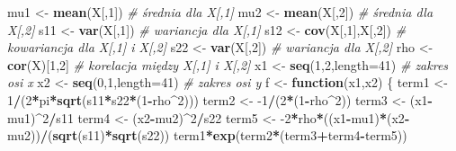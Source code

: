 \documentclass[polish,]{book}
\newenvironment{Shaded}{\begin{snugshade}}{\end{snugshade}}
\newcommand{\CommentTok}[1]{\textcolor[rgb]{0.56,0.35,0.01}{\textit{#1}}}
\newcommand{\ControlFlowTok}[1]{\textcolor[rgb]{0.13,0.29,0.53}{\textbf{#1}}}
\newcommand{\DataTypeTok}[1]{\textcolor[rgb]{0.13,0.29,0.53}{#1}}
\newcommand{\DecValTok}[1]{\textcolor[rgb]{0.00,0.00,0.81}{#1}}
\newcommand{\KeywordTok}[1]{\textcolor[rgb]{0.13,0.29,0.53}{\textbf{#1}}}
\newcommand{\NormalTok}[1]{#1}
\newcommand{\OperatorTok}[1]{\textcolor[rgb]{0.81,0.36,0.00}{\textbf{#1}}}
\newcommand{\StringTok}[1]{\textcolor[rgb]{0.31,0.60,0.02}{#1}}
\begin{document}
\begin{Shaded}
\begin{Highlighting}[]
\NormalTok{mu1 <-}\StringTok{ }\KeywordTok{mean}\NormalTok{(X[,}\DecValTok{1}\NormalTok{])      }\CommentTok{# średnia dla X[,1]}
\NormalTok{mu2 <-}\StringTok{ }\KeywordTok{mean}\NormalTok{(X[,}\DecValTok{2}\NormalTok{])      }\CommentTok{# średnia dla X[,2]}
\NormalTok{s11 <-}\StringTok{ }\KeywordTok{var}\NormalTok{(X[,}\DecValTok{1}\NormalTok{])       }\CommentTok{# wariancja dla X[,1]}
\NormalTok{s12 <-}\StringTok{ }\KeywordTok{cov}\NormalTok{(X[,}\DecValTok{1}\NormalTok{],X[,}\DecValTok{2}\NormalTok{]) }\CommentTok{# kowariancja dla X[,1] i X[,2]}
\NormalTok{s22 <-}\StringTok{ }\KeywordTok{var}\NormalTok{(X[,}\DecValTok{2}\NormalTok{])       }\CommentTok{# wariancja dla X[,2]}
\NormalTok{rho <-}\StringTok{ }\KeywordTok{cor}\NormalTok{(X)[}\DecValTok{1}\NormalTok{,}\DecValTok{2}\NormalTok{]      }\CommentTok{# korelacja między X[,1] i X[,2]}
\NormalTok{x1 <-}\StringTok{ }\KeywordTok{seq}\NormalTok{(}\DecValTok{1}\NormalTok{,}\DecValTok{2}\NormalTok{,}\DataTypeTok{length=}\DecValTok{41}\NormalTok{)      }\CommentTok{# zakres osi x}
\NormalTok{x2 <-}\StringTok{ }\KeywordTok{seq}\NormalTok{(}\DecValTok{0}\NormalTok{,}\DecValTok{1}\NormalTok{,}\DataTypeTok{length=}\DecValTok{41}\NormalTok{)      }\CommentTok{# zakres osi y}
\NormalTok{f <-}\StringTok{ }\ControlFlowTok{function}\NormalTok{(x1,x2)}
\NormalTok{  \{}
\NormalTok{  term1 <-}\StringTok{ }\DecValTok{1}\OperatorTok{/}\NormalTok{(}\DecValTok{2}\OperatorTok{*}\NormalTok{pi}\OperatorTok{*}\KeywordTok{sqrt}\NormalTok{(s11}\OperatorTok{*}\NormalTok{s22}\OperatorTok{*}\NormalTok{(}\DecValTok{1}\OperatorTok{-}\NormalTok{rho}\OperatorTok{^}\DecValTok{2}\NormalTok{)))}
\NormalTok{  term2 <-}\StringTok{ }\DecValTok{-1}\OperatorTok{/}\NormalTok{(}\DecValTok{2}\OperatorTok{*}\NormalTok{(}\DecValTok{1}\OperatorTok{-}\NormalTok{rho}\OperatorTok{^}\DecValTok{2}\NormalTok{))}
\NormalTok{  term3 <-}\StringTok{ }\NormalTok{(x1}\OperatorTok{-}\NormalTok{mu1)}\OperatorTok{^}\DecValTok{2}\OperatorTok{/}\NormalTok{s11}
\NormalTok{  term4 <-}\StringTok{ }\NormalTok{(x2}\OperatorTok{-}\NormalTok{mu2)}\OperatorTok{^}\DecValTok{2}\OperatorTok{/}\NormalTok{s22}
\NormalTok{  term5 <-}\StringTok{ }\DecValTok{-2}\OperatorTok{*}\NormalTok{rho}\OperatorTok{*}\NormalTok{((x1}\OperatorTok{-}\NormalTok{mu1)}\OperatorTok{*}\NormalTok{(x2}\OperatorTok{-}\NormalTok{mu2))}\OperatorTok{/}\NormalTok{(}\KeywordTok{sqrt}\NormalTok{(s11)}\OperatorTok{*}\KeywordTok{sqrt}\NormalTok{(s22))}
\NormalTok{  term1}\OperatorTok{*}\KeywordTok{exp}\NormalTok{(term2}\OperatorTok{*}\NormalTok{(term3}\OperatorTok{+}\NormalTok{term4}\OperatorTok{-}\NormalTok{term5))}

\end{Highlighting}
\end{Shaded}
\end{document}
